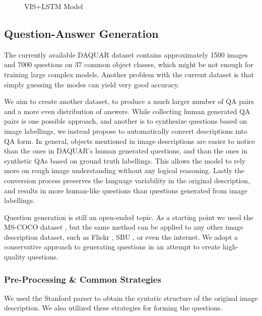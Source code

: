 \documentclass{article} %
\renewcommand{\#}[1]{\textbf{#1}}
\begin{document}
\begin{figure}
\centering
\scalebox{0.6}{
}
\caption{VIS+LSTM Model}
\label{fig:imgword}
\end{figure}

\subsection{Question-Answer Generation}

The currently available DAQUAR dataset contains approximately 1500 images and
7000 questions on 37 common object classes, which might be not enough for
training large complex models. Another problem with the current dataset is that
simply guessing the modes can yield very good accuracy.

We aim to create another dataset, to produce a much larger number of QA pairs
and a more even distribution of answers. While collecting human generated QA
pairs is one possible approach, and another is to synthesize questions based on
image labellings, we instead propose to automatically convert descriptions into
QA form. In general, objects mentioned in image descriptions are easier to
notice than the ones in DAQUAR's human generated questions, and than the ones
in synthetic QAs based on ground truth labellings. This allows the model to
rely more on rough image understanding without any logical reasoning. Lastly
the conversion process preserves the language variability in the original
description, and results in more human-like questions than questions generated
from image labellings.

Question generation is still an open-ended topic. As a starting point we used
the MS-COCO dataset \cite{mscoco}, but the same method can be applied to any
other image description dataset, such as Flickr \cite{flickr8k}, SBU
\cite{ordonez11}, or even the internet. We adopt a conservative approach to
generating questions in an attempt to create high-quality questions.

\subsubsection{Pre-Processing & Common Strategies}

We used the Stanford parser \cite{klein03} to obtain the syntatic structure of
the original image description. We also utilized these strategies for forming
the questions.
\end{document}
